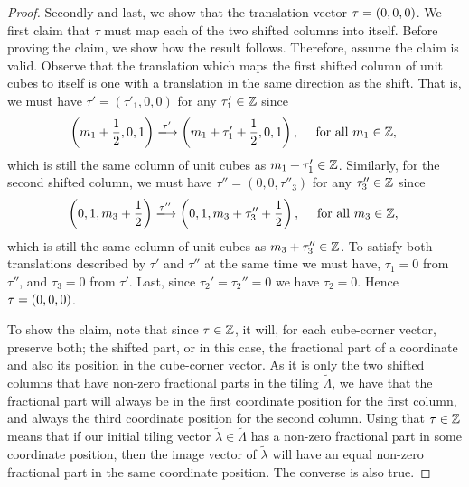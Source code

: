 \documentclass[../thesis.tex]{subfiles}
\begin{document}
\begin{proof}
Secondly and last, we show that the translation vector $\tau = (0,0,0)$. We first claim that $\tau$ must map each of the two shifted columns into itself. Before proving the claim, we show how the result follows. Therefore, assume the claim is valid. Observe that the translation which maps the first shifted column of unit cubes to itself is one with a translation in the same direction as the shift. That is, we must have $\tau' = (\tau'_1,0,0)$ for any $\tau'_1\in \mathbb{Z}$ since
\begin{equation*}
    \bracMed{m_1 + \frac{1}{2} ,0,1} \xlongrightarrow[]{\tau'} \bracMed{m_1+\tau'_1 + \frac{1}{2} ,0,1}, \quad \text{ for all } m_1 \in \Z,\\
\end{equation*}
which is still the same column of unit cubes as $m_1+\tau'_1\in\mathbb{Z}$. Similarly, for the second shifted column, we must have $\tau'' = (0,0,\tau''_3)$ for any $\tau''_3\in \mathbb{Z}$ since 
\begin{equation*}
    \bracMed{0,1,m_3 + \frac{1}{2} } \xlongrightarrow[]{\tau''} \bracMed{0,1,m_3+\tau''_3 + \frac{1}{2} } , \quad \text{ for all } m_3 \in \Z,\\
\end{equation*}
which is still the same column of unit cubes as $m_3+\tau''_3\in\mathbb{Z}$. To satisfy both translations described by $\tau'$ and $\tau''$ at the same time we must have, $\tau_1 = 0$ from $\tau''$, and $\tau_3 = 0$ from $\tau'$. Last, since $\tau_2'=\tau_2'' = 0$ we have $\tau_2=0$. Hence $\tau = (0,0,0)$.

To show the claim, note that since $\tau\in\mathbb{Z}$, it will, for each cube-corner vector, preserve both; the shifted part, or in this case, the fractional part of a coordinate and also its position in the cube-corner vector. As it is only the two shifted columns that have non-zero fractional parts in the tiling $\widetilde{\Lambda}$, we have that the fractional part will always be in the first coordinate position for the first column, and always the third coordinate position for the second column. Using that $\tau\in\mathbb{Z}$ means that if our initial tiling vector $\tilde{\lambda} \in \widetilde{\Lambda}$ has a non-zero fractional part in some coordinate position, then the image vector of $\tilde{\lambda}$ will have an equal non-zero fractional part in the same coordinate position. The converse is also true. 


\end{proof}
\end{document}
